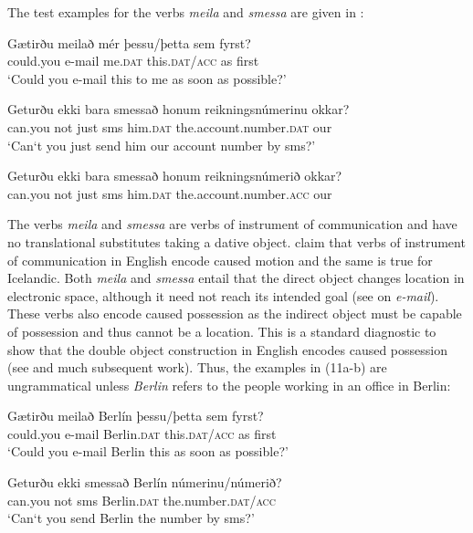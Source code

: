 \documentclass[output=paper,modfonts,nonflat,colorlinks,citecolor=brown]{langsci/langscibook}
\begin{document}
The test examples for the verbs \textit{meila} and \textit{smessa} are given in :

\ea%
    \label{ex:jonsson:10}  
\ea
\gll  Gætirðu  meilað  mér  þessu/þetta  sem  fyrst?\\
   could.you  e-mail  me.\textsc{dat}  this.\textsc{dat/acc}  as  first\\
\glt `Could you e-mail this to me as soon as possible?' 

\ex
\gll   Geturðu  ekki  bara  smessað  honum  reikningsnúmerinu  okkar?\\
 can.you  not  just  sms  him.\textsc{dat}  the.account.number.\textsc{dat}  our\\
\glt `Can‘t you just send him our account number by sms?' 

\ex
\gll   Geturðu  ekki  bara  smessað  honum  reikningsnúmerið  okkar?\\
 can.you  not  just  sms  him.\textsc{dat}  the.account.number.\textsc{acc}  our\\
\z
\z
 
The verbs \textit{meila} and \textit{smessa} are verbs of instrument of communication and have no translational substitutes taking a dative object.  \citet{RappaportHovavLevin2008} claim that verbs of instrument of communication in English encode caused motion and the same is true for Icelandic. Both \textit{meila} and \textit{smessa} entail that the direct object changes location in electronic space, although it need not reach its intended goal (see \citealt{Beavers2011} on \textit{e-mail}). These verbs also encode caused possession as the indirect object must be capable of possession and thus cannot be a location. This is a standard diagnostic to show that the double object construction in English encodes caused possession (see \citealt{Green1974} and much subsequent work). Thus, the examples in (11a-b) are ungrammatical unless \textit{Berlin} refers to the people working in an office in Berlin: 

 
\ea%
    \label{ex:jonsson:11} 
\ea
\gll  *Gætirðu  meilað  Berlín  þessu/þetta  sem  fyrst?\\
   could.you  e-mail  Berlin.\textsc{dat}  this.\textsc{dat/acc}  as  first\\
\glt `Could you e-mail Berlin this as soon as possible?' 

\ex
\gll   *Geturðu  ekki  smessað  Berlín  númerinu/númerið?\\
 can.you  not  sms  Berlin.\textsc{dat}  the.number.\textsc{dat/acc}\\
\glt `Can‘t you send Berlin the number by sms?'
\z
\z
\end{document}
